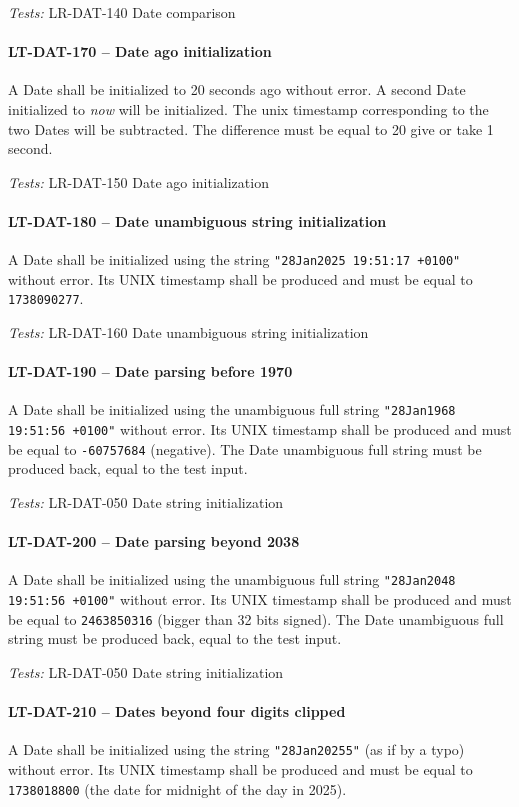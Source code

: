 \textit{Tests: } LR-DAT-140 Date comparison

\paragraph{LT-DAT-170 -- Date ago initialization}
A Date shall be initialized to 20 seconds ago without error.
A second Date initialized to \emph{now} will be initialized.
The unix timestamp corresponding to the two Dates will be
subtracted. The difference must be equal to 20 give or take 1 second.

\textit{Tests: } LR-DAT-150 Date ago initialization

\paragraph{LT-DAT-180 -- Date unambiguous string initialization}
A Date shall be initialized using the string
\lstinline{"28Jan2025 19:51:17 +0100"} without error.
Its UNIX timestamp shall be produced and must be equal to
\lstinline{1738090277}.

\textit{Tests: } LR-DAT-160 Date unambiguous string initialization

\paragraph{LT-DAT-190 -- Date parsing before 1970}
A Date shall be initialized using the unambiguous full string
\lstinline{"28Jan1968 19:51:56 +0100"} without error.
Its UNIX timestamp shall be produced and must be equal to
\lstinline{-60757684} (negative).
The Date unambiguous full string must be produced back,
equal to the test input.

\textit{Tests: } LR-DAT-050 Date string initialization

\paragraph{LT-DAT-200 -- Date parsing beyond 2038}
A Date shall be initialized using the unambiguous
full string \lstinline{"28Jan2048 19:51:56 +0100"} without error.
Its UNIX timestamp shall be produced and must be equal to
\lstinline{2463850316} (bigger than 32 bits signed).
The Date unambiguous full string must be produced back,
equal to the test input.

\textit{Tests: } LR-DAT-050 Date string initialization

\paragraph{LT-DAT-210 -- Dates beyond four digits clipped}
A Date shall be initialized using the string
\lstinline{"28Jan20255"} (as if by a typo) without error.
Its UNIX timestamp shall be produced and must be equal to
\lstinline{1738018800} (the date for midnight of the day in 2025).

